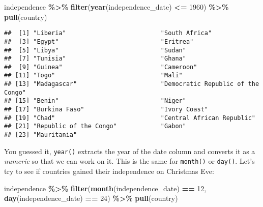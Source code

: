 \documentclass[
]{article}
\newenvironment{Shaded}{\begin{snugshade}}{\end{snugshade}}
\newcommand{\DecValTok}[1]{\textcolor[rgb]{0.00,0.00,0.81}{#1}}
\newcommand{\KeywordTok}[1]{\textcolor[rgb]{0.13,0.29,0.53}{\textbf{#1}}}
\newcommand{\NormalTok}[1]{#1}
\newcommand{\OperatorTok}[1]{\textcolor[rgb]{0.81,0.36,0.00}{\textbf{#1}}}
\newcommand{\StringTok}[1]{\textcolor[rgb]{0.31,0.60,0.02}{#1}}
\begin{document}
\begin{Shaded}
\begin{Highlighting}[]
\NormalTok{independence }\OperatorTok{\%\textgreater{}\%}
\StringTok{  }\KeywordTok{filter}\NormalTok{(}\KeywordTok{year}\NormalTok{(independence\_date) }\OperatorTok{\textless{}=}\StringTok{ }\DecValTok{1960}\NormalTok{) }\OperatorTok{\%\textgreater{}\%}
\StringTok{  }\KeywordTok{pull}\NormalTok{(country)}
\end{Highlighting}
\end{Shaded}

\begin{verbatim}
##  [1] "Liberia"                          "South Africa"                    
##  [3] "Egypt"                            "Eritrea"                         
##  [5] "Libya"                            "Sudan"                           
##  [7] "Tunisia"                          "Ghana"                           
##  [9] "Guinea"                           "Cameroon"                        
## [11] "Togo"                             "Mali"                            
## [13] "Madagascar"                       "Democratic Republic of the Congo"
## [15] "Benin"                            "Niger"                           
## [17] "Burkina Faso"                     "Ivory Coast"                     
## [19] "Chad"                             "Central African Republic"        
## [21] "Republic of the Congo"            "Gabon"                           
## [23] "Mauritania"
\end{verbatim}

You guessed it, \texttt{year()} extracts the year of the date column and converts it as a \emph{numeric} so that we can work
on it. This is the same for \texttt{month()} or \texttt{day()}. Let's try to see if countries gained their independence on
Christmas Eve:

\begin{Shaded}
\begin{Highlighting}[]
\NormalTok{independence }\OperatorTok{\%\textgreater{}\%}
\StringTok{  }\KeywordTok{filter}\NormalTok{(}\KeywordTok{month}\NormalTok{(independence\_date) }\OperatorTok{==}\StringTok{ }\DecValTok{12}\NormalTok{,}
         \KeywordTok{day}\NormalTok{(independence\_date) }\OperatorTok{==}\StringTok{ }\DecValTok{24}\NormalTok{) }\OperatorTok{\%\textgreater{}\%}
\StringTok{  }\KeywordTok{pull}\NormalTok{(country)}
\end{Highlighting}
\end{Shaded}
\end{document}
